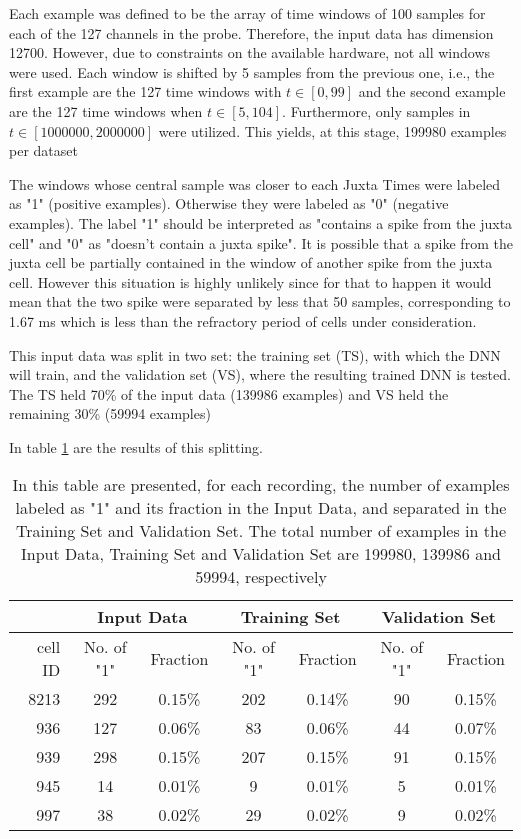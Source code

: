 Each example was defined to be the array of time windows of 100 samples for each of the 127 channels in the probe. Therefore, the input data has dimension 12700. However, due to constraints on the available hardware, not all windows were used. Each window is shifted by 5 samples from the previous one, i.e., the first example are the 127 time windows with $t \in [ 0 , 99]$ and the second example are the 127 time windows when $t \in [ 5, 104]$. Furthermore, only samples in $t \in [1000000,2000000]$ were utilized. This yields, at this stage, 199980 examples per dataset

The windows whose central sample was closer to each Juxta Times were labeled as "1" (positive examples). Otherwise they were labeled as "0" (negative examples). The label "1" should be interpreted as "contains a spike from the juxta cell" and "0" as "doesn't contain a juxta spike". It is possible that a spike from the juxta cell be partially contained in the window of another spike from the juxta cell. However this situation is highly unlikely since for that to happen it would mean that the two spike were separated by less that 50 samples, corresponding to 1.67 ms which is less than the refractory period of cells under consideration.

This input data was split in two set: the training set (TS), with which the DNN will train, and the validation set (VS), where the resulting trained DNN is tested. The TS held 70\% of the input data (139986 examples) and VS held the remaining 30\% (59994 examples)

In table \ref{table:summary-beforeUS} are the results of this splitting.
\begin{table}[htbp]
\begin{center}
\begin{tabular}{r|cc|cc|cc}
\multicolumn{1}{l|}{} & \multicolumn{ 2}{c|}{Input Data} & \multicolumn{ 2}{c|}{Training Set} & \multicolumn{ 2}{c}{Validation Set} \\ \hline
cell ID & No. of "1"  & Fraction & No. of "1"  & Fraction & No. of "1" & Fraction \\ \hline
8213 & 292 & 0.15\% & 202 & 0.14\% & 90 & 0.15\% \\ 
936 & 127 & 0.06\% & 83 & 0.06\% & 44 & 0.07\% \\ 
939 & 298 & 0.15\% & 207 & 0.15\% & 91 & 0.15\% \\ 
945 & 14 & 0.01\% & 9 & 0.01\% & 5 & 0.01\% \\ 
997 & 38 & 0.02\% & 29 & 0.02\% & 9 & 0.02\% \\ 
\end{tabular}
\end{center}
\caption{In this table are presented, for each recording, the number of examples labeled as "1" and its fraction in the Input Data, and separated in the Training Set and Validation Set. The total number of examples in the Input Data, Training Set and Validation Set are 199980, 139986 and 59994, respectively}
\label{table:summary-beforeUS}
\end{table}

